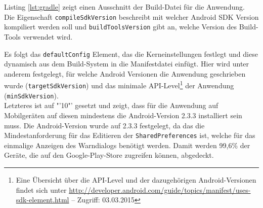 Listing \ref{lst:gradle} zeigt einen Ausschnitt der Build-Datei für die Anwendung. \\
Die Eigenschaft \texttt{compileSdkVersion} beschreibt mit welcher Android \gls{SDK} Version kompiliert werden soll und \texttt{buildToolsVersion} gibt an, welche Version des Build-Tools verwendet wird.
\begin{center}
\grayRule \grayRule
\end{center}
Es folgt das \texttt{defaultConfig} Element, das die Kerneinstellungen festlegt und diese dynamisch aus dem Build-System in die  Manifestdatei einfügt. Hier wird unter anderem festgelegt, für welche Android Versionen die Anwendung geschrieben wurde (\texttt{targetSdkVersion}) und das minimale \gls{API}-Level\footnote{ Eine Übersicht über die \gls{API}-Level und der dazugehörigen Android-Versionen findet sich unter \url{http://developer.android.com/guide/topics/manifest/uses-sdk-element.html} -- Zugriff: 03.03.2015} der Anwendung (\texttt{minSdkVersion}).\\ 
Letzteres ist auf "'10"' gesetzt und zeigt, dass für die Anwendung auf Mobilgeräten auf diesen mindestens die Android-Version 2.3.3 installiert sein muss. 
Die Android-Version wurde auf 2.3.3 festgelegt, da das die Mindestanforderung für das Editieren der \texttt{SharedPreferences} ist, welche für das einmalige Anzeigen des Warndialogs benötigt werden. Damit werden 99,6\% der Geräte, die auf den Google-Play-Store zugreifen können, abgedeckt. \cite{android_version} 
%
%
\clearpage
